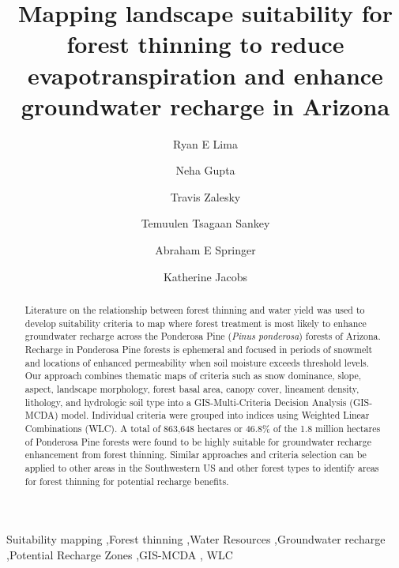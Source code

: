 \documentclass[
  number,
  preprint,
  3p,
  onecolumn]{elsarticle}
\begin{document}
\begin{frontmatter}
\title{Mapping landscape suitability for forest thinning to reduce
evapotranspiration and enhance groundwater recharge in Arizona}
\author[1]{Ryan E Lima%
%
}
\author[2]{Neha Gupta%
%
}

\author[2]{Travis Zalesky%
%
}

\author[1]{Temuulen Tsagaan Sankey%
%
}

\author[1]{Abraham E Springer%
%
}

\author[2]{Katherine Jacobs%
%
}









        
\begin{abstract}
Literature on the relationship between forest thinning and water yield
was used to develop suitability criteria to map where forest treatment
is most likely to enhance groundwater recharge across the Ponderosa Pine
(\emph{Pinus ponderosa}) forests of Arizona. Recharge in Ponderosa Pine
forests is ephemeral and focused in periods of snowmelt and locations of
enhanced permeability when soil moisture exceeds threshold levels. Our
approach combines thematic maps of criteria such as snow dominance,
slope, aspect, landscape morphology, forest basal area, canopy cover,
lineament density, lithology, and hydrologic soil type into a
GIS-Multi-Criteria Decision Analysis (GIS-MCDA) model. Individual
criteria were grouped into indices using Weighted Linear Combinations
(WLC). A total of 863,648 hectares or 46.8\% of the 1.8 million hectares
of Ponderosa Pine forests were found to be highly suitable for
groundwater recharge enhancement from forest thinning. Similar
approaches and criteria selection can be applied to other areas in the
Southwestern US and other forest types to identify areas for forest
thinning for potential recharge benefits.
\end{abstract}





\begin{keyword}
    Suitability mapping \sep Forest thinning \sep Water
Resources \sep Groundwater recharge \sep Potential Recharge
Zones \sep GIS-MCDA \sep 
    WLC
\end{keyword}
\end{frontmatter}
    
\end{document}

